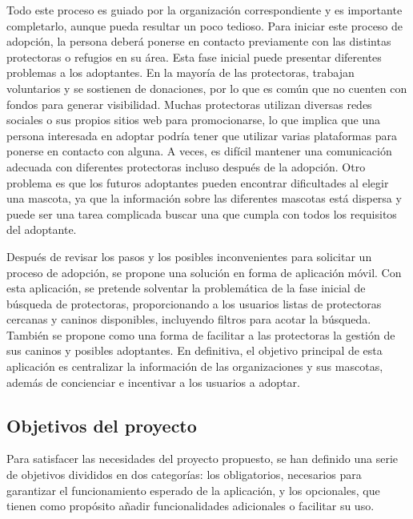 \documentclass[a4paper, 12pt]{article}
\begin{document}
Todo este proceso es guiado por la organización correspondiente y es importante completarlo, aunque pueda resultar un poco tedioso. Para iniciar este proceso de adopción, la persona deberá ponerse en contacto previamente con las distintas protectoras o refugios en su área. Esta fase inicial puede presentar diferentes problemas a los adoptantes. En la mayoría de las protectoras, trabajan voluntarios y se sostienen de donaciones, por lo que es común que no cuenten con fondos para generar visibilidad. Muchas protectoras utilizan diversas redes sociales o sus propios sitios web para promocionarse, lo que implica que una persona interesada en adoptar podría tener que utilizar varias plataformas para ponerse en contacto con alguna. A veces, es difícil mantener una comunicación adecuada con diferentes protectoras incluso después de la adopción. Otro problema es que los futuros adoptantes pueden encontrar dificultades al elegir una mascota, ya que la información sobre las diferentes mascotas está dispersa y puede ser una tarea complicada buscar una que cumpla con todos los requisitos del adoptante.

Después de revisar los pasos y los posibles inconvenientes para solicitar un proceso de adopción, se propone una solución en forma de aplicación móvil. Con esta aplicación, se pretende solventar la problemática de la fase inicial de búsqueda de protectoras, proporcionando a los usuarios listas de protectoras cercanas y caninos disponibles, incluyendo filtros para acotar la búsqueda. También se propone como una forma de facilitar a las protectoras la gestión de sus caninos y posibles adoptantes. En definitiva, el objetivo principal de esta aplicación es centralizar la información de las organizaciones y sus mascotas, además de concienciar e incentivar a los usuarios a adoptar.


\newpage
\subsection{Objetivos del proyecto}

Para satisfacer las necesidades del proyecto propuesto, se han definido una serie de objetivos divididos en dos categorías: los obligatorios, necesarios para garantizar el funcionamiento esperado de la aplicación, y los opcionales, que tienen como propósito añadir funcionalidades adicionales o facilitar su uso.
\end{document}
